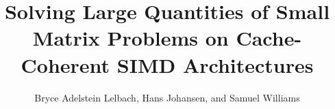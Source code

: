 \documentclass{sig-alternate-05-2015}
\begin{document}
\title{Solving Large Quantities of Small Matrix Problems on Cache-Coherent SIMD Architectures}

\author{
\alignauthor
Bryce Adelstein Lelbach, Hans Johansen, and Samuel Williams\\
\\
}


% 
\end{document}
